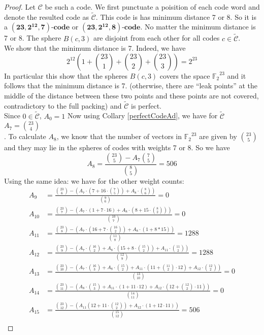 \documentclass{article}
\numberwithin{equation}{theorem}
\newcommand{\cCodes}{\ensuremath{\mathscr{C}}}
\newcommand{\tildcCodes}{\ensuremath{\widetilde{\mathscr{C}}}}
\newcommand{\code}[3]{\ensuremath{\bm{(#1,#2,#3)\mbox{-}code}}}
\newcommand{\ftwoN}[1]{\ensuremath{\mathbb{F}_2}^{#1}}
\begin{document}
\begin{proof}
Let {\cCodes} be such a code. We first punctuate a poisition 
of each code word and denote the resulted code as {\tildcCodes}.
This code is has minimum distance 7 or 8. So it is a {\code{23}{2^{12}}{7}} or {\code{23}{2^{12}}{8}}. No matter the minimum distance is 7 or 8. The sphere $B(c,3)$ are disjoint from each other for all codes $c \in \tildcCodes$.\\
We show that the minimum distance is 7.  Indeed, we have
\[
	2^{12}(1 + \binom{23}{1} + \binom{23}{2} + \binom{23}{3}) = 2^{23}
\]
In particular this show that the spheres $B(c,3)$ covers the space {$\ftwoN{23}$} and it follows that the minimum distance is 7. (otherwise, there are ``leak points'' at the middle of the distance between these two points and these points are not covered, contradictory to the full packing) and {\tildcCodes} is perfect.\\
Since $0 \in \tildcCodes$, $A_0 = 1$
Now using Collary \ref{perfectCodeAd}, we have for {\tildcCodes} $A_7 = \binom{23}{4}$\\.
To calculate $A_8$, we know that the number of vectors in $\ftwoN{23}$ are given by $\binom{23}{5}$ and they may lie in the spheres of codes with weights 7 or 8. So we have
\[
	A_8 = \frac{\binom{23}{5} - A_7\binom{7}{5}}{\binom{8}{5}} = 506
\]
Using the same idea: we have for the other weight counts:
	\begin{align*}
		A_9 &= \frac{\binom{23}{6} - (A_7 \cdot(7 + 16 \cdot \binom{7}{5}) + A_8\cdot \binom{8}{6})}{\binom{9}{6}} = 0\\
		A_{10} &= \frac{\binom{23}{7} - (A_7\cdot(1 + 7\cdot 16) + A_8\cdot(8 + 15 \cdot \binom{8}{2}))}{\binom{10}{7}} = 0 \\
		A_{11} &= \frac{\binom{23}{8} - (A_7\cdot(16 + 7\cdot \binom{16}{2}) + A_8\cdot(1 + 8 * 15))}{\binom{11}{8}} = 1288\\
		A_{12} &= \frac{\binom{23}{9} - (A_7\cdot\binom{16}{2} + A_8\cdot(15 + 8 \cdot \binom{15}{2}) + A_{11}\cdot\binom{11}{2})}{\binom{12}{9}} = 1288 \\
		A_{13} &= \frac{\binom{23}{10} - (A_7\cdot\binom{16}{3} + A_8 \cdot \binom{15}{2} + A_{11} \cdot(11 + \binom{11}{2} \cdot 12) + A_{12} \cdot \binom{12}{2})}{\binom{13}{10}} = 0\\
		A_{14} &= \frac{\binom{23}{11} - (A_8 \cdot \binom{15}{3} + A_{11} \cdot(1 + 11 \cdot 12) + A_{12} \cdot(12 + \binom{12}{2} \cdot 11))}{\binom{14}{11}} = 0\\
		A_{15} &= \frac{\binom{23}{12} - (A_{11}(12 + 11 \cdot \binom{12}{2}) + A_{12}\cdot(1 + 12\cdot 11))}{\binom{15}{12}} = 506 \\

\end{align*}
\end{proof}
\end{document}
